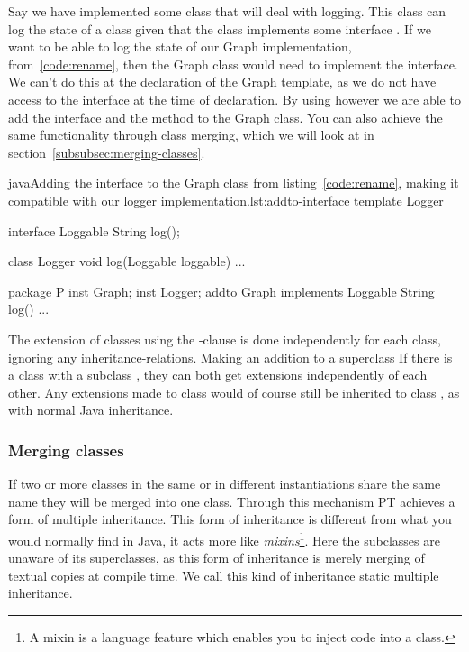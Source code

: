 Say we have implemented some class that will deal with logging.
This class can log the state of a class given that the class implements some interface .
If we want to be able to log the state of our Graph implementation, from~\vref{code:rename}, then the Graph class would need to implement the  interface.
We can't do this at the declaration of the Graph template, as we do not have access to the interface at the time of declaration.
By using  however we are able to add the  interface and the  method to the Graph class.
You can also achieve the same functionality through class merging, which we will look at in section~\vref{subsubsec:merging-classes}.

\begin{code}{java}{Adding the  interface to the Graph class from listing~\vref{code:rename}, making it compatible with our logger implementation.}{lst:addto-interface}
    template Logger {
        interface Loggable {
            String log();
        }

        class Logger {
            void log(Loggable loggable) {
                ...
            }
        }
    }

    package P {
        inst Graph;
        inst Logger;
        addto Graph implements Loggable {
            String log() {
                ...
            }
        }
    }
\end{code}

The extension of classes using the -clause is done independently for each class, ignoring any inheritance-relations.
Making an addition to a superclass
If there is a class  with a subclass , they can both get extensions independently of each other.
Any extensions made to class  would of course still be inherited to class , as with normal Java inheritance.


\subsubsection{Merging classes}\label{subsubsec:merging-classes}

If two or more classes in the same or in different instantiations share the same name they will be merged into one class.
Through this mechanism PT achieves a form of multiple inheritance.
This form of inheritance is different from what you would normally find in Java, it acts more like \textit{mixins}\footnote{A mixin is a language feature which enables you to inject code into a class.}.
Here the subclasses are unaware of its superclasses, as this form of inheritance is merely merging of textual copies at compile time.
We call this kind of inheritance static multiple inheritance.

